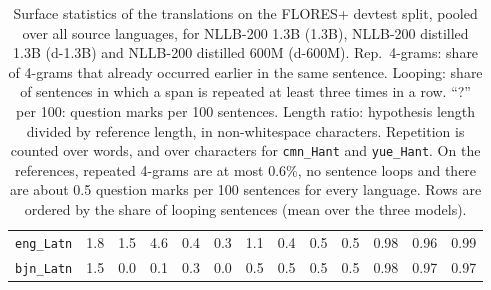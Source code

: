 \begin{table}[!htbp]
{\begin{tabular}{@{}l rrr rrr rrr rrr@{}}
\texttt{eng\_Latn} & 1.8 & 1.5 & 4.6 & 0.4 & 0.3 & 1.1 & 0.4 & 0.5 & 0.5 & 0.98 & 0.96 & 0.99 \\
\texttt{bjn\_Latn} & 1.5 & 0.0 & 0.1 & 0.3 & 0.0 & 0.5 & 0.5 & 0.5 & 0.5 & 0.98 & 0.97 & 0.97 \\
\bottomrule
\end{tabular}}
\caption{Surface statistics of the translations on the FLORES+ devtest split, pooled over all source languages, for NLLB-200 1.3B (1.3B), NLLB-200 distilled 1.3B (d-1.3B) and NLLB-200 distilled 600M (d-600M). Rep.\ 4-grams: share of 4-grams that already occurred earlier in the same sentence. Looping: share of sentences in which a span is repeated at least three times in a row. ``?'' per 100: question marks per 100 sentences. Length ratio: hypothesis length divided by reference length, in non-whitespace characters. Repetition is counted over words, and over characters for \texttt{cmn\_Hant} and \texttt{yue\_Hant}. On the references, repeated 4-grams are at most 0.6\%, no sentence loops and there are about 0.5 question marks per 100 sentences for every language. Rows are ordered by the share of looping sentences (mean over the three models).}
\label{tab:output-stats}
\end{table}
